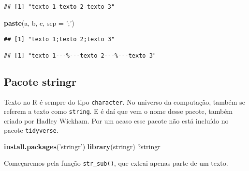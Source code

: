 \documentclass[]{book}
\newenvironment{Shaded}{\begin{snugshade}}{\end{snugshade}}
\newcommand{\KeywordTok}[1]{\textcolor[rgb]{0.13,0.29,0.53}{\textbf{#1}}}
\newcommand{\DataTypeTok}[1]{\textcolor[rgb]{0.13,0.29,0.53}{#1}}
\newcommand{\StringTok}[1]{\textcolor[rgb]{0.31,0.60,0.02}{#1}}
\newcommand{\NormalTok}[1]{#1}
\begin{document}
\begin{verbatim}
## [1] "texto 1-texto 2-texto 3"
\end{verbatim}

\begin{Shaded}
\begin{Highlighting}[]
\KeywordTok{paste}\NormalTok{(a, b, c, }\DataTypeTok{sep =} \StringTok{';'}\NormalTok{)}
\end{Highlighting}
\end{Shaded}

\begin{verbatim}
## [1] "texto 1;texto 2;texto 3"
\end{verbatim}

\begin{Shaded}
\end{Shaded}

\begin{verbatim}
## [1] "texto 1---%---texto 2---%---texto 3"
\end{verbatim}

\subsection{Pacote stringr}\label{pacote-stringr}

Texto no R é sempre do tipo \texttt{character}. No universo da
computação, também se referem a texto como \texttt{string}. E é daí que
vem o nome desse pacote, também criado por Hadley Wickham. Por um acaso
esse pacote não está incluído no pacote \texttt{tidyverse}.

\begin{Shaded}
\begin{Highlighting}[]
\KeywordTok{install.packages}\NormalTok{(}\StringTok{'stringr'}\NormalTok{)}
\KeywordTok{library}\NormalTok{(stringr)}
\NormalTok{?stringr}
\end{Highlighting}
\end{Shaded}

Começaremos pela função \texttt{str\_sub()}, que extrai apenas parte de
um texto.
\end{document}

